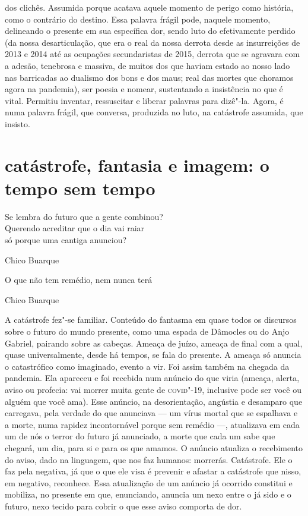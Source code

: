 dos clichês. Assumida porque acatava aquele momento de perigo como
história, como o contrário do destino. Essa palavra frágil pode, naquele
momento, delineando o presente em sua específica dor, sendo luto do
efetivamente perdido (da nossa desarticulação, que era o real da nossa
derrota desde as insurreições de 2013 e 2014 até as ocupações
secundaristas de 2015, derrota que se agravara com a adesão, tenebrosa e
massiva, de muitos dos que haviam estado ao nosso lado nas barricadas ao
dualismo dos bons e dos maus; real das mortes que choramos agora na
pandemia), ser poesia e nomear, sustentando a insistência no que é
vital. Permitiu inventar, ressuscitar e liberar palavras para dizê"-la.
Agora, é numa palavra frágil, que conversa, produzida no luto, na
catástrofe assumida, que insisto.

\section{catástrofe, fantasia e imagem: o tempo sem tempo}

\epigraph{Se lembra do futuro que a gente combinou?\\
Querendo acreditar que o dia vai raiar\\
só porque uma cantiga anunciou?}{Chico Buarque}

\epigraph{O que não tem remédio, nem nunca terá}{Chico Buarque}

A catástrofe fez"-se familiar. Conteúdo do fantasma em quase todos os
discursos sobre o futuro do mundo presente, como uma espada de Dâmocles
ou do Anjo Gabriel, pairando sobre as cabeças. Ameaça de juízo, ameaça
de final com a qual, quase universalmente, desde há tempos, se fala do
presente. A ameaça só anuncia o catastrófico como imaginado, evento a
vir. Foi assim também na chegada da pandemia. Ela apareceu e foi
recebida num anúncio do que viria (ameaça, alerta, aviso ou profecia:
vai morrer muita gente de \textsc{covid}"-19, inclusive pode ser você ou alguém
que você ama). Esse anúncio, na desorientação, angústia e desamparo que
carregava, pela verdade do que anunciava --- um vírus mortal que se
espalhava e a morte, numa rapidez incontornável porque sem remédio ---,
atualizava em cada um de nós o terror do futuro já anunciado, a morte
que cada um sabe que chegará, um dia, para si e para os que amamos. O
anúncio atualiza o recebimento do aviso, dado na linguagem, que nos faz
humanos: morrerás. Catástrofe. Ele o faz pela negativa, já que o que ele
visa é prevenir e afastar a catástrofe que nisso, em negativo,
reconhece. Essa atualização de um anúncio já ocorrido constitui e
mobiliza, no presente em que, enunciando, anuncia um nexo entre o já
sido e o futuro, nexo tecido para cobrir o que esse aviso comporta de
dor.

